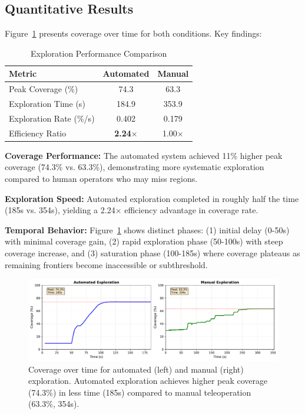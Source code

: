 \documentclass[conference]{IEEEtran}
\begin{document}
\subsection{Quantitative Results}

Figure~\ref{fig:coverage} presents coverage over time for both conditions. Key findings:

\begin{table}[h]
\centering
\caption{Exploration Performance Comparison}
\label{tab:results}
\begin{tabular}{lcc}
\toprule
\textbf{Metric} & \textbf{Automated} & \textbf{Manual} \\
\midrule
Peak Coverage (\%) & 74.3 & 63.3 \\
Exploration Time (s) & 184.9 & 353.9 \\
Exploration Rate (\%/s) & 0.402 & 0.179 \\
Efficiency Ratio & \textbf{2.24$\times$} & 1.00$\times$ \\
\bottomrule
\end{tabular}
\end{table}

\textbf{Coverage Performance:} The automated system achieved 11\% higher peak coverage (74.3\% vs. 63.3\%), demonstrating more systematic exploration compared to human operators who may miss regions.

\textbf{Exploration Speed:} Automated exploration completed in roughly half the time (185s vs. 354s), yielding a 2.24$\times$ efficiency advantage in coverage rate.

\textbf{Temporal Behavior:} Figure~\ref{fig:coverage} shows distinct phases: (1) initial delay (0-50s) with minimal coverage gain, (2) rapid exploration phase (50-100s) with steep coverage increase, and (3) saturation phase (100-185s) where coverage plateaus as remaining frontiers become inaccessible or subthreshold.

\begin{figure}[t]
\centering
\includegraphics[width=\columnwidth]{figures/coverage_comparison.pdf}
\caption{Coverage over time for automated (left) and manual (right) exploration. Automated exploration achieves higher peak coverage (74.3\%) in less time (185s) compared to manual teleoperation (63.3\%, 354s).}
\label{fig:coverage}
\end{figure}
\end{document}
